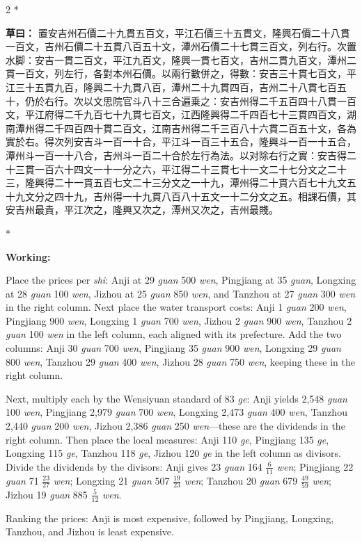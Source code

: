 \documentclass[11pt,a4paper]{article}
\newcommand{\CnWorking}[1]{\par\noindent\textbf{草曰：}#1\par\vspace{0.5ex}}
\newcommand{\EnWorking}{\par\noindent\textbf{Working:}\par\vspace{0.5ex}}
\newcommand{\switchCn}{\switchcolumn[0]*}
\newcommand{\switchEn}{\switchcolumn[1]*}
\begin{document}
\begin{paracol}{2}
\switchCn

\CnWorking{%
置安吉州石價二十九貫五百文，平江石價三十五貫文，隆興石價二十八貫一百文，吉州石價二十五貫八百五十文，潭州石價二十七貫三百文，列右行。次置水脚：安吉一貫二百文，平江九百文，隆興一貫七百文，吉州二貫九百文，潭州二貫一百文，列左行，各對本州石價。以兩行數併之，得數：安吉三十貫七百文，平江三十五貫九百，隆興二十九貫八百，潭州二十九貫四百，吉州二十八貫七百五十，仍於右行。次以文思院官斗八十三合遍乗之：安吉州得二千五百四十八貫一百文，平江府得二千九百七十九貫七百文，江西隆興得二千四百七十三貫四百文，湖南潭州得二千四百四十貫二百文，江南吉州得二千三百八十六貫二百五十文，各為實於右。得次列安吉斗一百一十合，平江斗一百三十五合，隆興斗一百一十五合，潭州斗一百一十八合，吉州斗一百二十合於左行為法。以对除右行之實：安吉得二十三貫一百六十四文一十一分之六，平江得二十三貫七十一文二十七分文之二十三，隆興得二十一貫五百七文二十三分文之一十九，潭州得二十貫六百七十九文五十九文分之四十九，吉州得一十九貫八百八十五文一十二分文之五。相課石價，其安吉州最貴，平江次之，隆興又次之，潭州又次之，吉州最賤。
}

\switchEn

\EnWorking
Place the prices per \textit{shi}: Anji at 29 \textit{guan} 500 \textit{wen}, Pingjiang at 35 \textit{guan}, Longxing at 28 \textit{guan} 100 \textit{wen}, Jizhou at 25 \textit{guan} 850 \textit{wen}, and Tanzhou at 27 \textit{guan} 300 \textit{wen} in the right column. Next place the water transport costs: Anji 1 \textit{guan} 200 \textit{wen}, Pingjiang 900 \textit{wen}, Longxing 1 \textit{guan} 700 \textit{wen}, Jizhou 2 \textit{guan} 900 \textit{wen}, Tanzhou 2 \textit{guan} 100 \textit{wen} in the left column, each aligned with its prefecture. Add the two columns: Anji 30 \textit{guan} 700 \textit{wen}, Pingjiang 35 \textit{guan} 900 \textit{wen}, Longxing 29 \textit{guan} 800 \textit{wen}, Tanzhou 29 \textit{guan} 400 \textit{wen}, Jizhou 28 \textit{guan} 750 \textit{wen}, keeping these in the right column.

Next, multiply each by the Wensiyuan standard of 83 \textit{ge}: Anji yields 2,548 \textit{guan} 100 \textit{wen}, Pingjiang 2,979 \textit{guan} 700 \textit{wen}, Longxing 2,473 \textit{guan} 400 \textit{wen}, Tanzhou 2,440 \textit{guan} 200 \textit{wen}, Jizhou 2,386 \textit{guan} 250 \textit{wen}---these are the dividends in the right column. Then place the local measures: Anji 110 \textit{ge}, Pingjiang 135 \textit{ge}, Longxing 115 \textit{ge}, Tanzhou 118 \textit{ge}, Jizhou 120 \textit{ge} in the left column as divisors. Divide the dividends by the divisors: Anji gives 23 \textit{guan} 164 $\frac{6}{11}$ \textit{wen}; Pingjiang 22 \textit{guan} 71 $\frac{23}{27}$ \textit{wen}; Longxing 21 \textit{guan} 507 $\frac{19}{23}$ \textit{wen}; Tanzhou 20 \textit{guan} 679 $\frac{49}{59}$ \textit{wen}; Jizhou 19 \textit{guan} 885 $\frac{5}{12}$ \textit{wen}.

Ranking the prices: Anji is most expensive, followed by Pingjiang, Longxing, Tanzhou, and Jizhou is least expensive.

\end{paracol}
\end{document}
